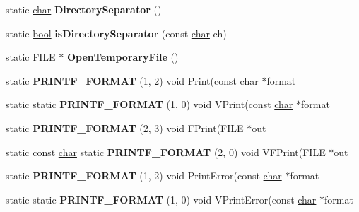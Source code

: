 \begin{DoxyCompactItemize}
static \mbox{\hyperlink{classchar}{char}} {\bfseries Directory\+Separator} ()
\item 
\mbox{\label{classv8_1_1base_1_1OS_ae9b48025d23fcd0a98f968d90e7107d4}} 
static \mbox{\hyperlink{classbool}{bool}} {\bfseries is\+Directory\+Separator} (const \mbox{\hyperlink{classchar}{char}} ch)
\item 
\mbox{\label{classv8_1_1base_1_1OS_a7984e131b66b92c725f30666de50d4e6}} 
static F\+I\+LE $\ast$ {\bfseries Open\+Temporary\+File} ()
\item 
\mbox{\label{classv8_1_1base_1_1OS_afa68bde0181d52d77a29c110255bf9e2}} 
static {\bfseries P\+R\+I\+N\+T\+F\+\_\+\+F\+O\+R\+M\+AT} (1, 2) void Print(const \mbox{\hyperlink{classchar}{char}} $\ast$format
\item 
\mbox{\label{classv8_1_1base_1_1OS_a068bf3678403943a7e9450afcc57b978}} 
static static {\bfseries P\+R\+I\+N\+T\+F\+\_\+\+F\+O\+R\+M\+AT} (1, 0) void V\+Print(const \mbox{\hyperlink{classchar}{char}} $\ast$format
\item 
\mbox{\label{classv8_1_1base_1_1OS_a7483e74426cd21f16559d17148d837b4}} 
static {\bfseries P\+R\+I\+N\+T\+F\+\_\+\+F\+O\+R\+M\+AT} (2, 3) void F\+Print(F\+I\+LE $\ast$out
\item 
\mbox{\label{classv8_1_1base_1_1OS_a2a636218497d7d88c88cdad2e6cc30d5}} 
static const \mbox{\hyperlink{classchar}{char}} static {\bfseries P\+R\+I\+N\+T\+F\+\_\+\+F\+O\+R\+M\+AT} (2, 0) void V\+F\+Print(F\+I\+LE $\ast$out
\item 
\mbox{\label{classv8_1_1base_1_1OS_a60d63758e5e0110e020f240116e7bb6e}} 
static {\bfseries P\+R\+I\+N\+T\+F\+\_\+\+F\+O\+R\+M\+AT} (1, 2) void Print\+Error(const \mbox{\hyperlink{classchar}{char}} $\ast$format
\item 
\mbox{\label{classv8_1_1base_1_1OS_aafc23e67df04850d7dd3a3cb0c660b17}} 
static static {\bfseries P\+R\+I\+N\+T\+F\+\_\+\+F\+O\+R\+M\+AT} (1, 0) void V\+Print\+Error(const \mbox{\hyperlink{classchar}{char}} $\ast$format
\item 

\end{DoxyCompactItemize}
